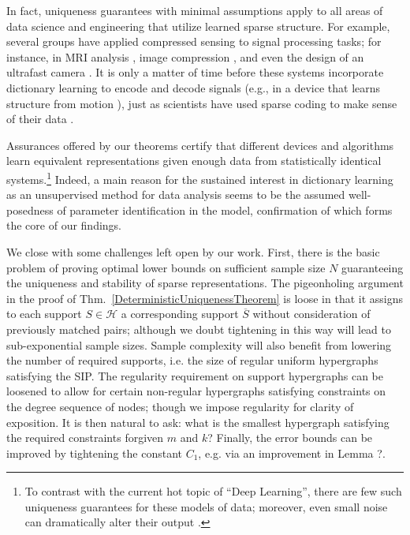 \documentclass[journal, twocolumn]{IEEEtran}
\begin{document}
In fact, uniqueness guarantees with minimal assumptions apply to all areas of data science and engineering that utilize learned sparse structure. For example, several groups have applied compressed sensing to signal processing tasks; for instance, in MRI analysis \cite{lustig2008compressed}, image compression \cite{Duarte08}, and even the design of an ultrafast camera \cite{Gao14}. It is only a matter of time before these systems incorporate dictionary learning to encode and decode signals (e.g., in a device that learns structure from motion \cite{kong2016prior}), just as scientists have used sparse coding to make sense of their data \cite{jung2001imaging, agarwal2014spatially, lee2016sparse, wu2016stability}. 

Assurances offered by our theorems certify that different devices and algorithms learn equivalent representations given enough data from statistically identical systems.\footnote{To contrast with the current hot topic of ``Deep Learning'', there are few such uniqueness guarantees for these models of data; moreover, even small noise can dramatically alter their output \cite{goodfellow2014explaining}.} 
Indeed, a main reason for the sustained interest in dictionary learning as an unsupervised method for data analysis seems to be the assumed well-posedness of parameter identification in the model, confirmation of which forms the core of our findings.

We close with some challenges left open by our work. First, there is the basic problem of proving optimal lower bounds on sufficient sample size $N$ guaranteeing the uniqueness and stability of sparse representations. The pigeonholing argument in the proof of Thm.~\ref{DeterministicUniquenessTheorem} is loose in that it assigns to each support $S \in \mathcal{H}$ a corresponding support $\overline S$ without consideration of previously matched pairs; although we doubt tightening in this way will lead to sub-exponential sample sizes. Sample complexity will also benefit from lowering the number of required supports, i.e. the size of regular uniform hypergraphs satisfying the SIP. The regularity requirement on support hypergraphs can be loosened to allow for certain non-regular hypergraphs satisfying constraints on the degree sequence of nodes; though we impose regularity for clarity of exposition. It is then natural to ask: what is the smallest hypergraph satisfying the required constraints forgiven $m$ and $k$? Finally, the error bounds can be improved by tightening the constant $C_1$, e.g. via an improvement in Lemma ?.
\end{document}
